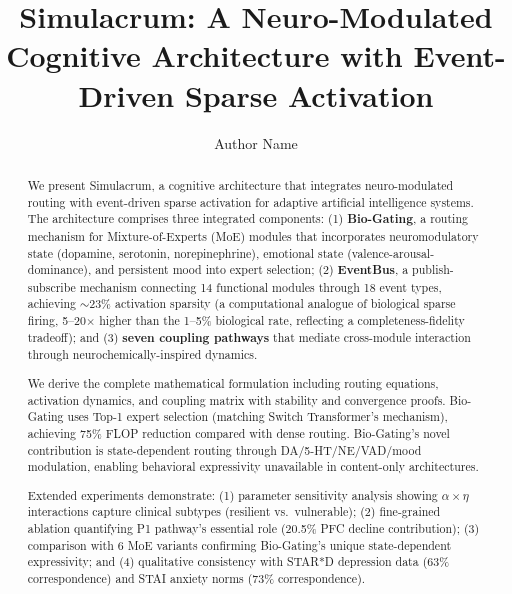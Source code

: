 \documentclass[preprint,12pt]{elsarticle}
\begin{document}
\begin{frontmatter}

\title{Simulacrum: A Neuro-Modulated Cognitive Architecture with Event-Driven Sparse Activation}

\author[inst1]{Author Name}



\begin{abstract}
We present Simulacrum, a cognitive architecture that integrates neuro-modulated routing with event-driven sparse activation for adaptive artificial intelligence systems. The architecture comprises three integrated components: (1) \textbf{Bio-Gating}, a routing mechanism for Mixture-of-Experts (MoE) modules that incorporates neuromodulatory state (dopamine, serotonin, norepinephrine), emotional state (valence-arousal-dominance), and persistent mood into expert selection; (2) \textbf{EventBus}, a publish-subscribe mechanism connecting 14 functional modules through 18 event types, achieving $\sim$23\% activation sparsity (a computational analogue of biological sparse firing, 5--20$\times$ higher than the 1--5\% biological rate, reflecting a completeness-fidelity tradeoff); and (3) \textbf{seven coupling pathways} that mediate cross-module interaction through neurochemically-inspired dynamics.

We derive the complete mathematical formulation including routing equations, activation dynamics, and coupling matrix with stability and convergence proofs. Bio-Gating uses Top-1 expert selection (matching Switch Transformer's mechanism), achieving 75\% FLOP reduction compared with dense routing. Bio-Gating's novel contribution is state-dependent routing through DA/5-HT/NE/VAD/mood modulation, enabling behavioral expressivity unavailable in content-only architectures.

Extended experiments demonstrate: (1) parameter sensitivity analysis showing $\alpha \times \eta$ interactions capture clinical subtypes (resilient vs.\ vulnerable); (2) fine-grained ablation quantifying P1 pathway's essential role (20.5\% PFC decline contribution); (3) comparison with 6 MoE variants confirming Bio-Gating's unique state-dependent expressivity; and (4) qualitative consistency with STAR*D depression data (63\% correspondence) and STAI anxiety norms (73\% correspondence).


\end{abstract}
\end{frontmatter}
\end{document}

